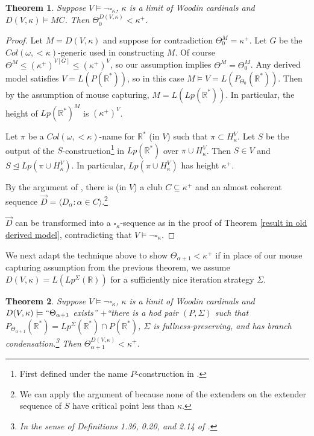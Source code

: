 \documentclass[12pt]{article}
\newtheorem{theorem}{Theorem}[section]
\newcommand\R{\mathbb{R}}
\begin{document}
\begin{theorem}
\label{theta_0 < kappa+}
    Suppose $V\models \neg \square_\kappa$, $\kappa$ is a limit of Woodin cardinals and $D(V,\kappa)\models MC$. Then $\Theta_0^{D(V,\kappa)} < \kappa^+$.
\end{theorem}
\begin{proof}

Let $M = D(V,\kappa)$ and suppose for contradiction $\Theta_0^M = \kappa^+$. Let $G$ be the $Col(\omega,<\kappa)$-generic used in constructing $M$. Of course $\Theta^M \leq (\kappa^+)^{V[G]} \leq (\kappa^+)^V$, so our assumption implies $\Theta^M = \Theta_0^M$. Any derived model satisfies $V = L(P(\R^*))$, so in this case $M \models V = L(P_{\Theta_0}(\R^*))$. Then by the assumption of mouse capturing, $M = L(Lp(\R^*))$. In particular, the height of $Lp(\R^*)^M$ is $(\kappa^+)^V$.

Let $\pi$ be a $Col(\omega,<\kappa)$-name for $\R^*$ (in $V$) such that $\pi\subset H_\kappa^V$. Let $S$ be the output of the $S$-construction\footnote{First defined under the name $P$-construction in \cite{self-iter}.} in $Lp(\R^*)$ over $\pi\cup H^V_\kappa$. Then $S\in V$ and $S\trianglelefteq Lp(\pi\cup H^V_\kappa)$. In particular, $Lp(\pi \cup H^V_\kappa)$ has height $\kappa^+$.

By the argument of \cite{coherent}, there is (in $V$) a club $C\subseteq \kappa^+$ and an almost coherent sequence $\vec{D} = \langle D_\alpha : \alpha \in C\rangle$.\footnote{ We can apply the argument of \cite{coherent} because none of the extenders on the extender sequence of $S$ have critical point less than $\kappa$.}

$\vec{D}$ can be transformed into a $\square_\kappa$-sequence as in the proof of Theorem \ref{result in old derived model}, contradicting that $V\models \neg \square_\kappa$.

\end{proof}

We next adapt the technique above to show $\Theta_{\alpha+1} < \kappa^+$ if in place of our mouse capturing assumption from the previous theorem, we assume $D(V,\kappa) = L(Lp^\Sigma(\R))$ for a sufficiently nice iteration strategy $\Sigma$.

\begin{theorem}
\label{theta < kappa+}
    Suppose $V\models \neg \square_\kappa$, $\kappa$ is a limit of Woodin cardinals and $D(V,\kappa)\models ``\Theta_{\alpha+1}$ exists'' $ + $``there is a hod pair $(P,\Sigma)$ such that $P_{\Theta_{\alpha+1}}(\R^*) = Lp^{\Sigma}(\R^*) \cap P(\R^*)$, $\Sigma$ is fullness-preserving, and has branch condensation.\footnote{In the sense of Definitions 1.36, 0.20, and 2.14 of \cite{hm&msc}.} Then $\Theta_{\alpha+1}^{D(V,\kappa)} < \kappa^+$.
\end{theorem}
\end{document}
